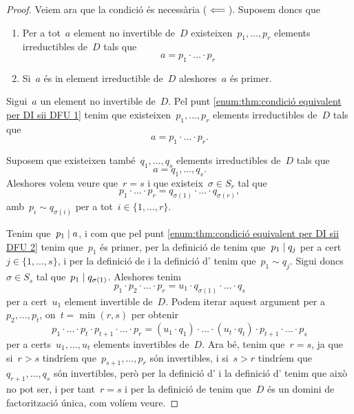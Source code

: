 \documentclass[../../main.tex]{subfiles}
\begin{document}
\begin{theorem}
\begin{proof}
            Veiem ara que la condició és necessària (\(\impliedby\)).
            Suposem doncs que
            \begin{enumerate}
                \item Per a tot~\(a\) element no invertible de~\(D\) existeixen~\(p_{1},\dots,p_{r}\) elements irreductibles de~\(D\) tals que
                \[
                    a=p_{1}\cdot\ldots\cdot p_{r}
                \]
                \item Si~\(a\) és in element irreductible de~\(D\) aleshores~\(a\) és primer.
            \end{enumerate}
            Sigui~\(a\) un element no invertible de~\(D\).
            Pel punt \eqref{enum:thm:condició equivalent per DI sii DFU 1} tenim que existeixen~\(p_{1},\dots,p_{r}\) elements irreductibles de~\(D\) tals que
            \[
                a=p_{1}\cdot\ldots\cdot p_{r}.
            \]

            Suposem que existeixen també~\(q_{1},\dots,q_{s}\) elements irreductibles de~\(D\) tals que
            \[
                a=q_{1},\dots,q_{s}.
            \]
            Aleshores volem veure que~\(r=s\) i que existeix~\(\sigma\in S_{r}\) tal que
            \[
                p_{1}\cdot\ldots\cdot p_{r}=q_{\sigma(1)}\cdot\ldots\cdot q_{\sigma(r)},
            \]
            amb~\(p_{i}\sim q_{\sigma(i)}\) per a tot~\(i\in\{1,\dots,r\}\).

            Tenim que~\(p_{1}\mathrel{|} a\), i com que pel punt \eqref{enum:thm:condició equivalent per DI sii DFU 2} tenim que~\(p_{1}\) és primer, per la definició de  tenim que~\(p_{1}\mathrel{|} q_{j}\) per a cert~\(j\in\{1,\dots,s\}\), i per la definició de  i la definició d' tenim que~\(p_{1}\sim q_{j}\).
            Sigui doncs~\(\sigma\in S_{s}\) tal que~\(p_{1}\mathrel{|} q_{\sigma(1)}\).
            Aleshores tenim
            \[
                p_{1}\cdot p_{2}\cdot\ldots\cdot p_{r}=u_{1}\cdot q_{\sigma(1)}\cdot\ldots\cdot q_{s}
            \]
            per a cert~\(u_{1}\) element invertible de~\(D\).
            Podem iterar aquest argument per a~\(p_{2},\dots,p_{t}\), on~\(t=\min(r,s)\) per obtenir
            \[
                p_{1}\cdot\ldots\cdot p_{t}\cdot p_{t+1}\cdot\ldots\cdot p_{r}=(u_{1}\cdot q_{1})\cdot\ldots\cdot(u_{t}\cdot q_{t})\cdot p_{t+1}\cdot\ldots \cdot p_{s}
            \]
            per a certs~\(u_{1},\dots, u_{t}\) elements invertibles de~\(D\).
            Ara bé, tenim que~\(r=s\), ja que si~\(r>s\) tindríem que~\(p_{s+1},\dots,p_{r}\) són invertibles, i si~\(s>r\) tindríem que~\(q_{r+1},\dots,q_{s}\) són invertibles, però per la definició d' i la definició d' tenim que això no pot ser, i per tant~\(r=s\) i per la definició de  tenim que~\(D\) és un domini de factorització única, com volíem veure.
        \end{proof}
    \end{theorem}
\end{document}
